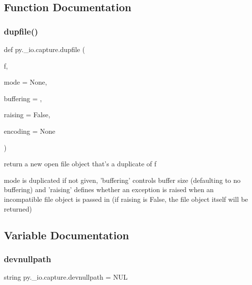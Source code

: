 \subsection{Function Documentation}
\mbox{\label{namespacepy_1_1__io_1_1capture_ac1d822a17260bf0f089f12b2cc995415}} 
\subsubsection{\texorpdfstring{dupfile()}{dupfile()}}
{\footnotesize\ttfamily def py.\+\_\+io.\+capture.\+dupfile (\begin{DoxyParamCaption}\item[{}]{f,  }\item[{}]{mode = {\ttfamily None},  }\item[{}]{buffering = {},  }\item[{}]{raising = {\ttfamily False},  }\item[{}]{encoding = {\ttfamily None} }\end{DoxyParamCaption})}

\begin{DoxyVerb}return a new open file object that's a duplicate of f

    mode is duplicated if not given, 'buffering' controls
    buffer size (defaulting to no buffering) and 'raising'
    defines whether an exception is raised when an incompatible
    file object is passed in (if raising is False, the file
    object itself will be returned)
\end{DoxyVerb}
 

\subsection{Variable Documentation}
\mbox{\label{namespacepy_1_1__io_1_1capture_a2470908410c83bd8715713d3b220b3af}} 
\subsubsection{\texorpdfstring{devnullpath}{devnullpath}}
{\footnotesize\ttfamily string py.\+\_\+io.\+capture.\+devnullpath = \textquotesingle{}N\+UL\textquotesingle{}}


